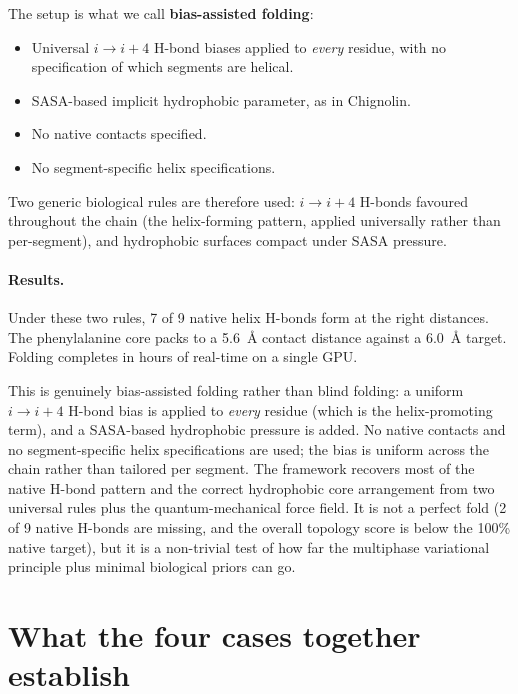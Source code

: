 The setup is what we call \textbf{bias-assisted folding}:
\begin{itemize}
\item Universal $i \to i{+}4$ H-bond biases applied to \emph{every} residue, with no specification of which segments are helical.
\item SASA-based implicit hydrophobic parameter, as in Chignolin.
\item No native contacts specified.
\item No segment-specific helix specifications.
\end{itemize}
Two generic biological rules are therefore used: $i \to i{+}4$ H-bonds favoured throughout the chain (the helix-forming pattern, applied universally rather than per-segment), and hydrophobic surfaces compact under SASA pressure.

\paragraph{Results.}
Under these two rules, 7 of 9 native helix H-bonds form at the right distances. The phenylalanine core packs to a 5.6~\AA{} contact distance against a 6.0~\AA{} target. Folding completes in hours of real-time on a single GPU.

This is genuinely bias-assisted folding rather than blind folding: a uniform $i \to i{+}4$ H-bond bias is applied to \emph{every} residue (which is the helix-promoting term), and a SASA-based hydrophobic pressure is added. No native contacts and no segment-specific helix specifications are used; the bias is uniform across the chain rather than tailored per segment. The framework recovers most of the native H-bond pattern and the correct hydrophobic core arrangement from two universal rules plus the quantum-mechanical force field. It is not a perfect fold (2 of 9 native H-bonds are missing, and the overall topology score is below the 100\% native target), but it is a non-trivial test of how far the multiphase variational principle plus minimal biological priors can go.

\section{What the four cases together establish}\label{sec:folding-summary}

